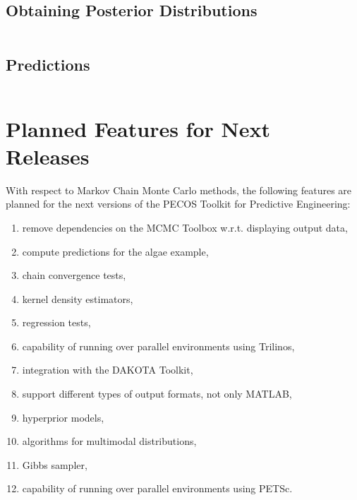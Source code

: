 \subsection{Obtaining Posterior Distributions}
$~$\\

\subsection{Predictions}
$~$\\

\clearpage

\section{Planned Features for Next Releases}\label{sc-gmc-planned-features}
With respect to Markov Chain Monte Carlo methods, the following features are planned for the next versions of the PECOS Toolkit for Predictive Engineering:
\begin{enumerate}
\item remove dependencies on the MCMC Toolbox w.r.t. displaying output data,
\item compute predictions for the algae example,
\item chain convergence tests,
\item kernel density estimators,
\item regression tests,
\item capability of running over parallel environments using Trilinos,
\item integration with the DAKOTA Toolkit,
\item support different types of output formats, not only MATLAB,
\item hyperprior models,
\item algorithms for multimodal distributions,
\item Gibbs sampler,
\item capability of running over parallel environments using PETSc.
\end{enumerate}
 
